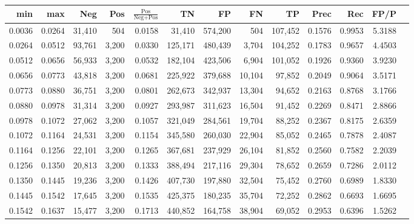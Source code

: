 \begin{tabular}{rrrrrrrrrrrrr}
\toprule
   min &    max &    Neg &   Pos & $\frac{\text{Pos}}{\text{Neg}+\text{Pos}}$ &      TN &      FP &      FN &      TP &   Prec &    Rec &   FP/P \\
\midrule
0.0036 & 0.0264 & 31,410 &   504 &                                     0.0158 &  31,410 & 574,200 &     504 & 107,452 & 0.1576 & 0.9953 & 5.3188 \\
0.0264 & 0.0512 & 93,761 & 3,200 &                                     0.0330 & 125,171 & 480,439 &   3,704 & 104,252 & 0.1783 & 0.9657 & 4.4503 \\
0.0512 & 0.0656 & 56,933 & 3,200 &                                     0.0532 & 182,104 & 423,506 &   6,904 & 101,052 & 0.1926 & 0.9360 & 3.9230 \\
0.0656 & 0.0773 & 43,818 & 3,200 &                                     0.0681 & 225,922 & 379,688 &  10,104 &  97,852 & 0.2049 & 0.9064 & 3.5171 \\
0.0773 & 0.0880 & 36,751 & 3,200 &                                     0.0801 & 262,673 & 342,937 &  13,304 &  94,652 & 0.2163 & 0.8768 & 3.1766 \\
0.0880 & 0.0978 & 31,314 & 3,200 &                                     0.0927 & 293,987 & 311,623 &  16,504 &  91,452 & 0.2269 & 0.8471 & 2.8866 \\
0.0978 & 0.1072 & 27,062 & 3,200 &                                     0.1057 & 321,049 & 284,561 &  19,704 &  88,252 & 0.2367 & 0.8175 & 2.6359 \\
0.1072 & 0.1164 & 24,531 & 3,200 &                                     0.1154 & 345,580 & 260,030 &  22,904 &  85,052 & 0.2465 & 0.7878 & 2.4087 \\
0.1164 & 0.1256 & 22,101 & 3,200 &                                     0.1265 & 367,681 & 237,929 &  26,104 &  81,852 & 0.2560 & 0.7582 & 2.2039 \\
0.1256 & 0.1350 & 20,813 & 3,200 &                                     0.1333 & 388,494 & 217,116 &  29,304 &  78,652 & 0.2659 & 0.7286 & 2.0112 \\
0.1350 & 0.1445 & 19,236 & 3,200 &                                     0.1426 & 407,730 & 197,880 &  32,504 &  75,452 & 0.2760 & 0.6989 & 1.8330 \\
0.1445 & 0.1542 & 17,645 & 3,200 &                                     0.1535 & 425,375 & 180,235 &  35,704 &  72,252 & 0.2862 & 0.6693 & 1.6695 \\
0.1542 & 0.1637 & 15,477 & 3,200 &                                     0.1713 & 440,852 & 164,758 &  38,904 &  69,052 & 0.2953 & 0.6396 & 1.5262 \\

\end{tabular}
